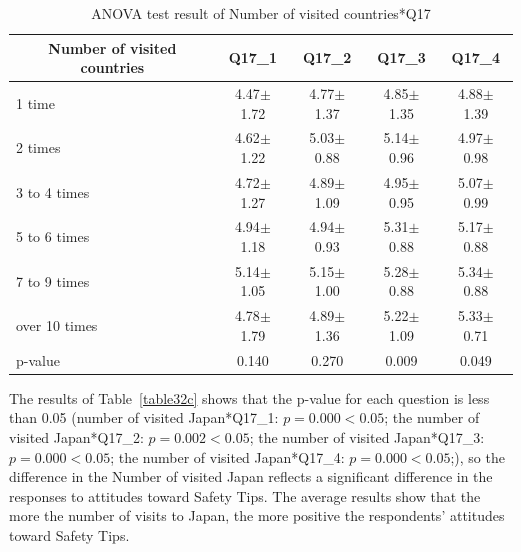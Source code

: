 \begin{table}[h]
  \caption{ANOVA test result of Number of visited countries*Q17}
  \label{table32b}
  \centering
  \begin{tabular}{l|cccc}
 \hline
        \multicolumn{1}{c|}{Number of visited countries}          & Q17\_1               & Q17\_2 & Q17\_3    & Q17\_4       \\
\hline
1 time        & 4.47$\pm$1.72           & 4.77$\pm$1.37  & 4.85$\pm$1.35 & 4.88$\pm$1.39  \\
2 times       & 4.62$\pm$1.22 & 5.03$\pm$0.88 & 5.14$\pm$0.96 & 4.97$\pm$0.98  \\
3 to 4 times  & 4.72$\pm$1.27 & 4.89$\pm$1.09 & 4.95$\pm$0.95& 5.07$\pm$0.99 \\
5 to 6 times  & 4.94$\pm$1.18 & 4.94$\pm$0.93& 5.31$\pm$0.88 & 5.17$\pm$0.88 \\
7 to 9 times  & 5.14$\pm$1.05 & 5.15$\pm$1.00 & 5.28$\pm$0.88 & 5.34$\pm$0.88 \\
over 10 times & 4.78$\pm$1.79& 4.89$\pm$1.36 & 5.22$\pm$1.09 & 5.33$\pm$0.71\\
\hline
p-value&           0.140&         0.270&         0.009&   0.049     \\
 \hline
  \end{tabular}
\end{table}



The results of Table~\ref{table32c} shows that the p-value for each question is less than 0.05 (number of visited Japan*Q17\_1: $p=0.000<0.05$; the number of visited Japan*Q17\_2: $p=0.002<0.05$; the number of visited Japan*Q17\_3: $p=0.000<0.05$; the number of visited Japan*Q17\_4: $p=0.000<0.05$;), so the difference in the Number of visited Japan reflects a significant difference in the responses to attitudes toward Safety Tips. The average results show that the more the number of visits to Japan, the more positive the respondents' attitudes toward Safety Tips. 


